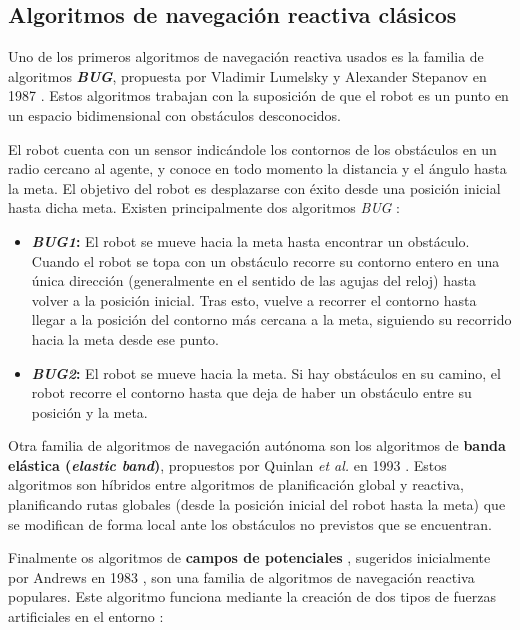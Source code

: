 \subsection{Algoritmos de navegación reactiva clásicos}

Uno de los primeros algoritmos de navegación reactiva usados es la familia de algoritmos \textbf{\textit{BUG}}, propuesta por Vladimir Lumelsky y Alexander Stepanov en 1987 \cite{journals/algorithmica/LumelskyS87}. Estos algoritmos trabajan con la suposición de que el robot es un punto en un espacio bidimensional con obstáculos desconocidos. 

El robot cuenta con un sensor indicándole los contornos de los obstáculos en un radio cercano al agente, y conoce en todo momento la distancia y el ángulo hasta la meta. El objetivo del robot es desplazarse con éxito desde una posición inicial hasta dicha meta. Existen principalmente dos algoritmos \textit{BUG} \cite{lavalle:2006}:
\begin{itemize}
	\item \textbf{\textit{BUG1}:} El robot se mueve hacia la meta hasta encontrar un obstáculo. Cuando el robot se topa con un obstáculo recorre su contorno entero en una única dirección (generalmente en el sentido de las agujas del reloj) hasta volver a la posición inicial. Tras esto, vuelve a recorrer el contorno hasta llegar a la posición del contorno más cercana a la meta, siguiendo su recorrido hacia la meta desde ese punto.
	\item \textbf{\textit{BUG2}:} El robot se mueve hacia la meta. Si hay obstáculos en su camino, el robot recorre el contorno hasta que deja de haber un obstáculo entre su posición y la meta.
\end{itemize}

Otra familia de algoritmos de navegación autónoma son los algoritmos de \textbf{banda elástica (\textit{elastic band})}, propuestos por Quinlan \textit{et al.} en 1993 \cite{291936}. Estos algoritmos son híbridos entre algoritmos de planificación global y reactiva, planificando rutas globales (desde la posición inicial del robot hasta la meta) que se modifican de forma local ante los obstáculos no previstos que se encuentran.

Finalmente os algoritmos de \textbf{campos de potenciales} \cite{131810}, sugeridos inicialmente por Andrews en 1983 \cite{andrews1983impedance}, son una familia de algoritmos de navegación reactiva populares. Este algoritmo funciona mediante la creación de dos tipos de fuerzas artificiales en el entorno \cite{131810}:

